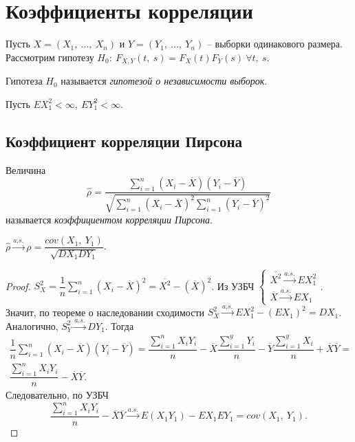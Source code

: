 \section{Коэффициенты корреляции}

Пусть $\displaystyle X=( X_{1} ,\ \dotsc ,\ X_{n})$ и $\displaystyle Y=( Y_{1} ,\ \dotsc ,\ Y_{n})$ -- выборки одинакового размера. Рассмотрим гипотезу $\displaystyle H_{0} :\ F_{X,Y}( t,\ s) =F_{X}( t) F_{Y}( s) \ \forall t,\ s$.
\begin{definition}
    Гипотеза $\displaystyle H_{0}$ называется \textit{гипотезой о независимости выборок}.
\end{definition}
Пусть $\displaystyle EX_{1}^{2} < \infty ,\ EY_{1}^{2} < \infty $.
\subsection{Коэффициент корреляции Пирсона}
\begin{definition}
    Величина
    \begin{equation*}
        \hat{\rho } =\dfrac{\sum _{i=1}^{n}( X_{i} -\overline{X})( Y_{i} -\overline{Y})}{\sqrt{\sum _{i=1}^{n}( X_{i} -\overline{X})^{2}\sum _{i=1}^{n}( Y_{i} -\overline{Y})^{2}}}
    \end{equation*}
    называется \textit{коэффициентом корреляции Пирсона}.
\end{definition}
\begin{proposition}
    $\displaystyle \hat{\rho }\xrightarrow{a.s.} \rho =\dfrac{cov( X_{1} ,\ Y_{1})}{\sqrt{DX_{1} DY_{1}}}$.
\end{proposition}
\begin{proof}
    $\displaystyle S_{X}^{2} =\dfrac{1}{n}\sum _{i=1}^{n}( X_{i} -\overline{X})^{2} =\overline{X^{2}} -(\overline{X})^{2}$. Из УЗБЧ $\displaystyle \begin{cases}
    \overline{X^{2}}\xrightarrow{a.s.} EX_{1}^{2}\\
    \overline{X}\xrightarrow{a.s.} EX_{1}
    \end{cases}$. Значит, по теореме о наследовании сходимости $\displaystyle S_{X}^{2}\xrightarrow{a.s.} EX_{1}^{2} -( EX_{1})^{2} =DX_{1}$. Аналогично, $\displaystyle S_{Y}^{2}\xrightarrow{a.s.} DY_{1}$. Тогда
    \begin{gather*}
        \dfrac{1}{n}\sum _{i=1}^{n}( X_{i} -\overline{X})( Y_{i} -\overline{Y}) =\dfrac{\sum _{i=1}^{n} X_{i} Y_{i}}{n} -\overline{X}\dfrac{\sum _{i=1}^{y} Y_{i}}{n} -\overline{Y}\dfrac{\sum _{i=1}^{y} X_{i}}{n} +\overline{X}\overline{Y} =\\
        \dfrac{\sum _{i=1}^{n} X_{i} Y_{i}}{n} -\overline{X}\overline{Y} .
    \end{gather*}
    Следовательно, по УЗБЧ
    \begin{equation*}
        \dfrac{\sum _{i=1}^{n} X_{i} Y_{i}}{n} -\overline{X}\overline{Y}\xrightarrow{a.s.} E( X_{1} Y_{1}) -EX_{1} EY_{1} =cov( X_{1} ,\ Y_{1}) .
    \end{equation*}
\end{proof}
